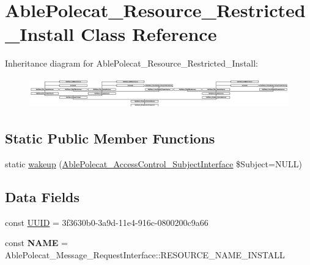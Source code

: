 \hypertarget{class_able_polecat___resource___restricted___install}{}\section{Able\+Polecat\+\_\+\+Resource\+\_\+\+Restricted\+\_\+\+Install Class Reference}
\label{class_able_polecat___resource___restricted___install}
Inheritance diagram for Able\+Polecat\+\_\+\+Resource\+\_\+\+Restricted\+\_\+\+Install\+:\begin{figure}[H]
\begin{center}
\leavevmode
\includegraphics[height=1.327913cm]{class_able_polecat___resource___restricted___install}
\end{center}
\end{figure}
\subsection*{Static Public Member Functions}
\begin{DoxyCompactItemize}
\item 
static \hyperlink{class_able_polecat___resource___restricted___install_a3f2135f6ad45f51d075657f6d20db2cd}{wakeup} (\hyperlink{interface_able_polecat___access_control___subject_interface}{Able\+Polecat\+\_\+\+Access\+Control\+\_\+\+Subject\+Interface} \$Subject=N\+U\+L\+L)
\end{DoxyCompactItemize}
\subsection*{Data Fields}
\begin{DoxyCompactItemize}
\item 
const \hyperlink{class_able_polecat___resource___restricted___install_a74b892c8c0b86bf9d04c5819898c51e7}{U\+U\+I\+D} = \textquotesingle{}3f3630b0-\/3a9d-\/11e4-\/916c-\/0800200c9a66\textquotesingle{}
\item 
\hypertarget{class_able_polecat___resource___restricted___install_a244352f035b82b20b0efa506167fd862}{}const {\bfseries N\+A\+M\+E} = Able\+Polecat\+\_\+\+Message\+\_\+\+Request\+Interface\+::\+R\+E\+S\+O\+U\+R\+C\+E\+\_\+\+N\+A\+M\+E\+\_\+\+I\+N\+S\+T\+A\+L\+L\label{class_able_polecat___resource___restricted___install_a244352f035b82b20b0efa506167fd862}

\end{DoxyCompactItemize}
